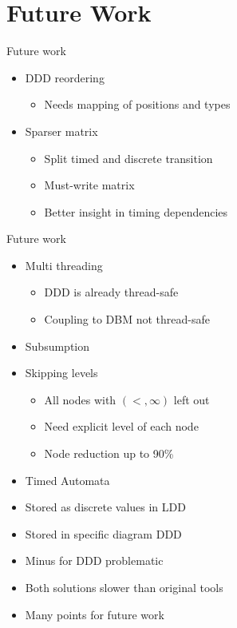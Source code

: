 \section{Future Work}

\begin{frame}{Future work}
\begin{itemize}
	\item {\large DDD reordering}
	\begin{itemize}
		\item {\large Needs mapping of positions and types}
	\end{itemize}
	\item {\large Sparser matrix}
	\begin{itemize}
		\item {\large Split timed and discrete transition}
		\item {\large Must-write matrix}
		\item {\large Better insight in timing dependencies}
	\end{itemize}
\end{itemize}
\end{frame}

\begin{frame}{Future work}
\begin{itemize}
	\item {\large Multi threading}
	\begin{itemize}
		\item {\large DDD is already thread-safe}
		\item {\large Coupling to DBM not thread-safe}
	\end{itemize}
	\item {\large Subsumption}
	\item {\large Skipping levels}
	\begin{itemize}
		\item {\large All nodes with $(<,\infty)$ left out}
		\item {\large Need explicit level of each node}
		\item {\large Node reduction up to 90\%	}
	\end{itemize}
\end{itemize}
\end{frame}

\begin{frame}
	\begin{itemize}
		\item Timed Automata
		\item Stored as discrete values in LDD
		\item Stored in specific diagram DDD
		\item Minus for DDD problematic
		\item Both solutions slower than original tools
		\item Many points for future work
	\end{itemize}
\end{frame}



